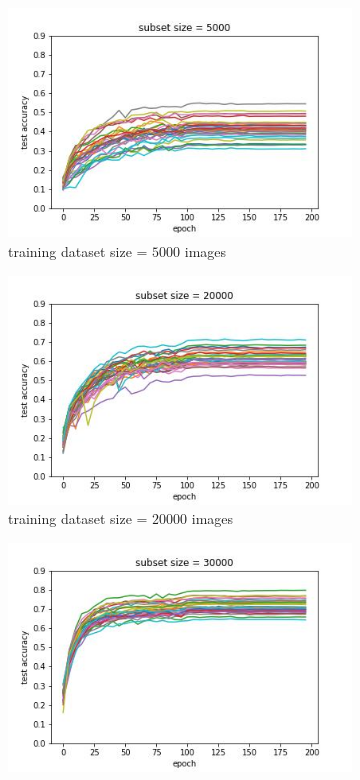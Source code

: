 \documentclass{article} %
\begin{document}
\begin{figure}
    \begin{subfigure}{.5\textwidth}
        \centering
        \includegraphics[width=.8\linewidth]{test_acc_vs_epoch_subset_size_5000}
        \caption{training dataset size = $5000$ images}
        \label{fig:subsetsize5000}
    \end{subfigure}%
    \begin{subfigure}{.5\textwidth}
        \centering
        \includegraphics[width=.8\linewidth]{test_acc_vs_epoch_subset_size_20000}
        \caption{training dataset size = $20000$ images}
        \label{fig:subsetsize20000}
    \end{subfigure}
    \begin{subfigure}{.5\textwidth}
        \centering
        \includegraphics[width=.8\linewidth]{test_acc_vs_epoch_subset_size_30000}

\end{subfigure}
\end{figure}
\end{document}
